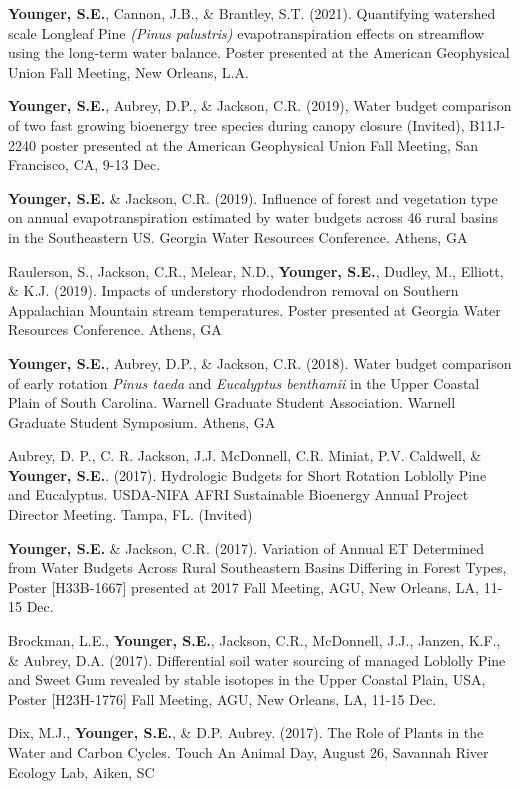 \documentclass[10pt,letterpaper]{article}
\begin{document}
\begin{hangparas}{.25in}{1}
		\textbf{Younger, S.E.}, Cannon, J.B., \& Brantley, S.T. (2021). Quantifying watershed scale Longleaf Pine \textit{(Pinus palustris)} evapotranspiration effects on streamflow using the long-term water balance. Poster presented at the American Geophysical Union Fall Meeting, New Orleans, L.A.
		
		\textbf{Younger, S.E.}, Aubrey, D.P., \& Jackson, C.R. (2019), Water budget comparison of two fast growing bioenergy tree species during canopy closure (Invited), B11J-2240 poster presented at the American Geophysical Union Fall Meeting, San Francisco, CA, 9-13 Dec.
		
		\textbf{Younger, S.E.} \& Jackson, C.R. (2019). Influence of forest and vegetation type on annual evapotranspiration estimated by water budgets across 46 rural basins in the Southeastern US. Georgia Water Resources Conference. Athens, GA
		
		Raulerson, S., Jackson, C.R., Melear, N.D., \textbf{Younger, S.E.}, Dudley, M., Elliott, \& K.J. (2019). Impacts of understory rhododendron removal on Southern Appalachian Mountain stream temperatures. Poster presented at Georgia Water Resources Conference. Athens, GA
		
		\textbf{Younger, S.E.}, Aubrey, D.P., \& Jackson, C.R. (2018). Water budget comparison of early rotation \textit{Pinus taeda} and \textit{Eucalyptus benthamii} in the Upper Coastal Plain of South Carolina. Warnell Graduate Student Association. Warnell Graduate Student Symposium. Athens, GA
		
		Aubrey, D. P., C. R. Jackson, J.J. McDonnell, C.R. Miniat, P.V. Caldwell, \& \textbf{Younger, S.E.}. (2017). Hydrologic Budgets for Short Rotation Loblolly Pine and Eucalyptus. USDA-NIFA AFRI Sustainable Bioenergy Annual Project Director Meeting. Tampa, FL. (Invited)
		
		\textbf{Younger, S.E.} \& Jackson, C.R. (2017). Variation of Annual ET Determined from Water Budgets Across Rural Southeastern Basins Differing in Forest Types, Poster [H33B-1667] presented at 2017 Fall Meeting, AGU, New Orleans, LA, 11-15 Dec.
		
		Brockman, L.E., \textbf{Younger, S.E.}, Jackson, C.R., McDonnell, J.J., Janzen, K.F., \& Aubrey, D.A. (2017). Differential soil water sourcing of managed Loblolly Pine and Sweet Gum revealed by stable isotopes in the Upper Coastal Plain, USA, Poster [H23H-1776] Fall Meeting, AGU, New Orleans, LA, 11-15 Dec.
		
		Dix, M.J., \textbf{Younger, S.E.}, \& D.P. Aubrey. (2017). The Role of Plants in the Water and Carbon Cycles. Touch An Animal Day, August 26, Savannah River Ecology Lab, Aiken, SC
		

\end{hangparas}
\end{document}
